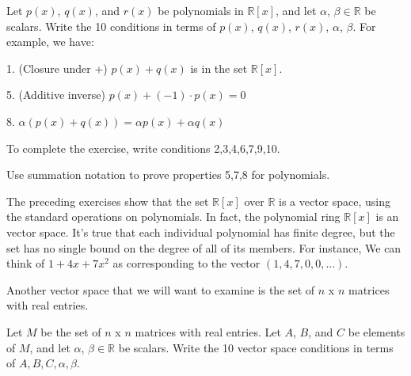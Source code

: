 \begin{exercise}{}
Let $p(x)$, $q(x)$, and $r(x)$ be polynomials in $\mathbb{R}[x]$, and let $\alpha$, $\beta\in\mathbb{R}$ be scalars.  Write the 10 conditions in terms of  $p(x)$, $q(x)$, $r(x)$, $\alpha$, $\beta$.  For example, we have:

1. (Closure under +) $p(x)+q(x)$ is in the set $\mathbb{R}[x]$.

5. (Additive inverse) $p(x)+(-1)\cdot p(x)=0$

8. $\alpha(p(x)+q(x))=\alpha p(x)+\alpha q(x)$

\noindent
To complete the exercise, write conditions 2,3,4,6,7,9,10. 
\end{exercise}

%

\begin{exercise}{}
Use summation notation to prove properties 5,7,8 for polynomials.
\end{exercise}

The preceding exercises show that  the set $\mathbb{R}[x]$ over $\mathbb{R}$ is a vector space, using the standard operations on polynomials. In fact, the polynomial ring $\mathbb{R}[x]$ is an  vector space. It's true that each individual polynomial has finite degree, but the set has no single bound on the degree of all of its members. For instance, We can think of $1 + 4x + 7x^2$ as corresponding to the vector $( 1, 4, 7, 0, 0,...)$.

Another vector space that we will want to examine is the set of $n$ x $n$ matrices with real entries.

\begin{exercise}{}
Let $M$ be the set of $n$ x $n$ matrices with real entries. Let $A$, $B$, and $C$ be elements of $M$, and let $\alpha$, $\beta\in\mathbb{R}$ be scalars.  Write the 10 vector space conditions in terms of  $A,B,C,\alpha,\beta$. 
\end{exercise}


